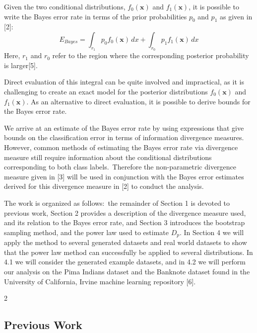 \documentclass{article}
\begin{document}
	Given the two conditional distributions, $f_0(\textbf{x})$ and $f_1(\textbf{x})$, it is possible to write the Bayes error rate in terms of the prior probabilities $p_0$ and $p_1$ as given in [2]:
	\begin{equation} E_{Bayes}=\int_{r_1} p_0f_0(\textbf{x}) \,dx + \int_{r_0} p_1f_1(\textbf{x}) \,dx	\end{equation}
	Here, $r_1$ and $r_0$ refer to the region where the corresponding posterior probability is larger[5].
	
	
	Direct evaluation of this integral can be quite involved and impractical, as it is challenging to create an exact model for the posterior distributions $f_0(\textbf{x})$ and $f_1(\textbf{x})$. As an alternative to direct evaluation, it is possible to derive bounds for the Bayes error rate.
	
	
	We arrive at an estimate of the Bayes error rate by using expressions that give bounds on the classification error in terms of information divergence measures. However, common methods of estimating the Bayes error rate via divergence measure still require information about the conditional distributions corresponding to both class labels.\ Therefore the non-parametric divergence measure given in [3] will be used in conjunction with the Bayes error estimates derived for this divergence measure in [2] to conduct the analysis.     
	
	
	The work is organized as follows:\ the remainder of Section 1 is devoted to previous work, Section 2 provides a description of the divergence measure used, and its relation to the Bayes error rate, and Section 3 introduces the bootstrap sampling method, and the power law used to estimate $D_p$. In Section 4 we will apply the method to several generated datasets and real world datasets to show that the power law method can successfully be applied to several distributions. In 4.1 we will consider the generated example datasets, and in 4.2 we will perform our analysis on the Pima Indians dataset and the Banknote dataset found in the University of California, Irvine machine learning repository [6].
	
	
	2
	\subsection*{\small Previous Work}	
	
	
\end{document}
